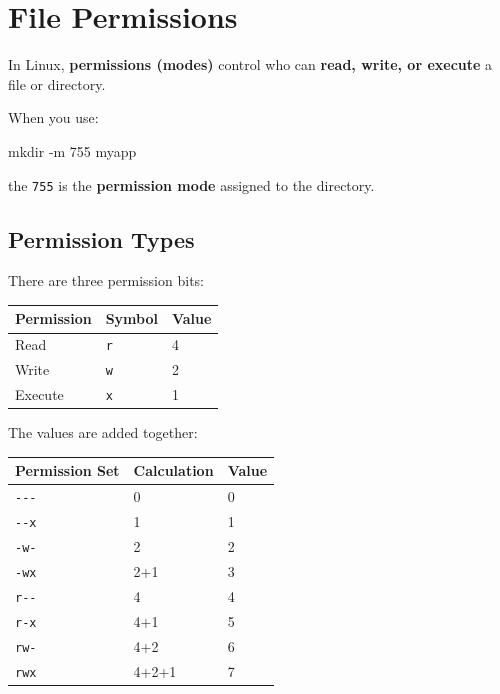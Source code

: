 \documentclass[11pt,a4paper]{article}
\begin{document}
\notebookcover

\section{File Permissions}

In Linux, \textbf{permissions (modes)} control who can \textbf{read, write, or execute} a
file or directory.

When you use:

\begin{sh}
mkdir -m 755 myapp
\end{sh}

the \lstinline|755| is the \textbf{permission mode} assigned to the directory.

\subsection{Permission Types}

There are three permission bits:

\begin{center}
\small
\begin{tabular}{@{}l l l@{}}
\toprule
\rowcolor{tablehead}\bfseries Permission & \bfseries Symbol & \bfseries Value \\
\midrule
Read    & \texttt{r} & 4 \\
Write   & \texttt{w} & 2 \\
Execute & \texttt{x} & 1 \\
\bottomrule
\end{tabular}
\end{center}

The values are added together:

\begin{center}
\small
\begin{tabular}{@{}l l l@{}}
\toprule
\rowcolor{tablehead}\bfseries Permission Set & \bfseries Calculation & \bfseries Value \\
\midrule
\texttt{-{}-{}-} & 0     & 0 \\
\texttt{-{}-x}   & 1     & 1 \\
\texttt{-w-}     & 2     & 2 \\
\texttt{-wx}     & 2+1   & 3 \\
\texttt{r-{}-}   & 4     & 4 \\
\texttt{r-x}     & 4+1   & 5 \\
\texttt{rw-}     & 4+2   & 6 \\
\texttt{rwx}     & 4+2+1 & 7 \\
\bottomrule
\end{tabular}
\end{center}
\end{document}
